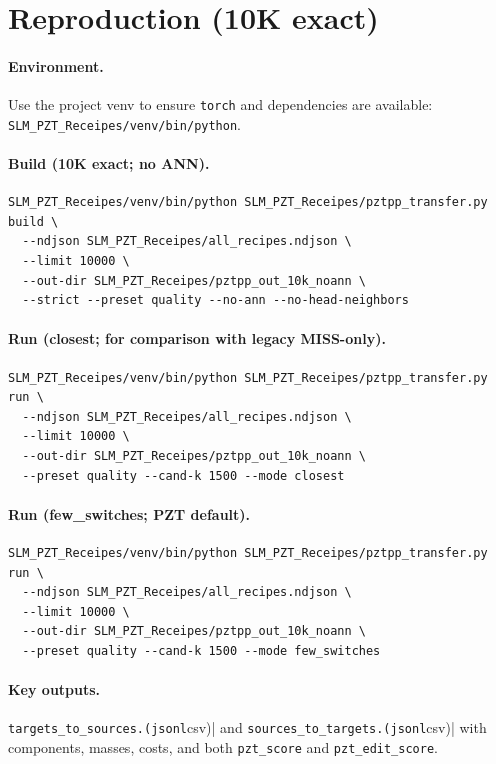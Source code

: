 \documentclass[11pt]{article}
\begin{document}
\section{Reproduction (10K exact)}
\paragraph{Environment.} Use the project venv to ensure \texttt{torch} and dependencies are available: \verb|SLM_PZT_Receipes/venv/bin/python|.

\paragraph{Build (10K exact; no ANN).}
\begin{verbatim}
SLM_PZT_Receipes/venv/bin/python SLM_PZT_Receipes/pztpp_transfer.py build \
  --ndjson SLM_PZT_Receipes/all_recipes.ndjson \
  --limit 10000 \
  --out-dir SLM_PZT_Receipes/pztpp_out_10k_noann \
  --strict --preset quality --no-ann --no-head-neighbors
\end{verbatim}

\paragraph{Run (closest; for comparison with legacy MISS-only).}
\begin{verbatim}
SLM_PZT_Receipes/venv/bin/python SLM_PZT_Receipes/pztpp_transfer.py run \
  --ndjson SLM_PZT_Receipes/all_recipes.ndjson \
  --limit 10000 \
  --out-dir SLM_PZT_Receipes/pztpp_out_10k_noann \
  --preset quality --cand-k 1500 --mode closest
\end{verbatim}

\paragraph{Run (few\_switches; PZT default).}
\begin{verbatim}
SLM_PZT_Receipes/venv/bin/python SLM_PZT_Receipes/pztpp_transfer.py run \
  --ndjson SLM_PZT_Receipes/all_recipes.ndjson \
  --limit 10000 \
  --out-dir SLM_PZT_Receipes/pztpp_out_10k_noann \
  --preset quality --cand-k 1500 --mode few_switches
\end{verbatim}

\paragraph{Key outputs.} \verb|targets_to_sources.(jsonl|csv)| and \verb|sources_to_targets.(jsonl|csv)| with components, masses, costs, and both \texttt{pzt\_score} and \texttt{pzt\_edit\_score}.
\end{document}
